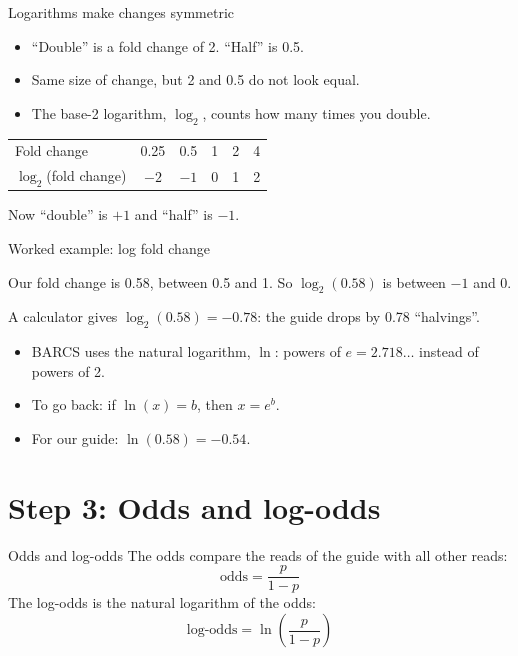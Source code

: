 \documentclass[aspectratio=169,11pt]{beamer}
\begin{document}
\begin{frame}{Logarithms make changes symmetric}
\begin{itemize}
\item ``Double'' is a fold change of 2. ``Half'' is 0.5.
\item Same size of change, but 2 and 0.5 do not look equal.
\item The \alert{base-2 logarithm}, $\log_2$, counts how many times you
  double.
\end{itemize}
\begin{center}
\begin{tabular}{lccccc}
\toprule
Fold change & 0.25 & 0.5 & 1 & 2 & 4\\
$\log_2$(fold change) & $-2$ & $-1$ & 0 & 1 & 2\\
\bottomrule
\end{tabular}
\end{center}
Now ``double'' is $+1$ and ``half'' is $-1$.
\end{frame}

\begin{frame}{Worked example: log fold change}
\begin{worked}[ 2]
Our fold change is 0.58, between 0.5 and 1.
So $\log_2(0.58)$ is between $-1$ and 0.

A calculator gives $\log_2(0.58) = -0.78$: the guide drops by 0.78
``halvings''.
\end{worked}
\begin{itemize}
\item BARCS uses the \alert{natural logarithm}, $\ln$: powers of
  $e = 2.718\ldots$ instead of powers of 2.
\item To go back: if $\ln(x) = b$, then $x = e^{b}$.
\item For our guide: $\ln(0.58) = -0.54$.
\end{itemize}
\end{frame}

\section{Step 3: Odds and log-odds}

\begin{frame}{Odds and log-odds}
The \alert{odds} compare the reads of the guide with all other reads:
\[
\text{odds} = \frac{p}{1-p}
\]
The \alert{log-odds} is the natural logarithm of the odds:
\[
\text{log-odds} = \ln\!\left(\frac{p}{1-p}\right)
\]
\end{frame}
\end{document}
